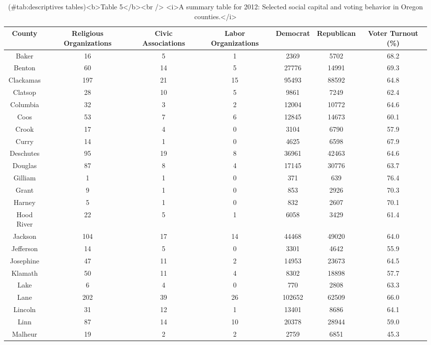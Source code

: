 \documentclass[
  english,
  man]{apa6}
\begin{document}
\begin{table}

\caption{(\#tab:descriptives tables)<b>Table 5</b><br /> <i>A summary table for 2012: Selected social capital and voting behavior in Oregon counties.</i>}
\centering
\begin{tabular}[t]{c|c|c|c|c|c|c}
\hline
County & Religious Organizations & Civic Associations & Labor Organizations & Democrat & Republican & Voter Turnout (\%)\\
\hline
Baker & 16 & 5 & 1 & 2369 & 5702 & 68.2\\
\hline
Benton & 60 & 14 & 5 & 27776 & 14991 & 69.3\\
\hline
Clackamas & 197 & 21 & 15 & 95493 & 88592 & 64.8\\
\hline
Clatsop & 28 & 10 & 5 & 9861 & 7249 & 62.4\\
\hline
Columbia & 32 & 3 & 2 & 12004 & 10772 & 64.6\\
\hline
Coos & 53 & 7 & 6 & 12845 & 14673 & 60.1\\
\hline
Crook & 17 & 4 & 0 & 3104 & 6790 & 57.9\\
\hline
Curry & 14 & 1 & 0 & 4625 & 6598 & 67.9\\
\hline
Deschutes & 95 & 19 & 8 & 36961 & 42463 & 64.6\\
\hline
Douglas & 87 & 8 & 4 & 17145 & 30776 & 63.7\\
\hline
Gilliam & 1 & 1 & 0 & 371 & 639 & 76.4\\
\hline
Grant & 9 & 1 & 0 & 853 & 2926 & 70.3\\
\hline
Harney & 5 & 1 & 0 & 832 & 2607 & 70.1\\
\hline
Hood River & 22 & 5 & 1 & 6058 & 3429 & 61.4\\
\hline
Jackson & 104 & 17 & 14 & 44468 & 49020 & 64.0\\
\hline
Jefferson & 14 & 5 & 0 & 3301 & 4642 & 55.9\\
\hline
Josephine & 47 & 11 & 2 & 14953 & 23673 & 64.5\\
\hline
Klamath & 50 & 11 & 4 & 8302 & 18898 & 57.7\\
\hline
Lake & 6 & 4 & 0 & 770 & 2808 & 63.3\\
\hline
Lane & 202 & 39 & 26 & 102652 & 62509 & 66.0\\
\hline
Lincoln & 31 & 12 & 1 & 13401 & 8686 & 64.1\\
\hline
Linn & 87 & 14 & 10 & 20378 & 28944 & 59.0\\
\hline
Malheur & 19 & 2 & 2 & 2759 & 6851 & 45.3\\

\end{tabular}
\end{table}
\end{document}
